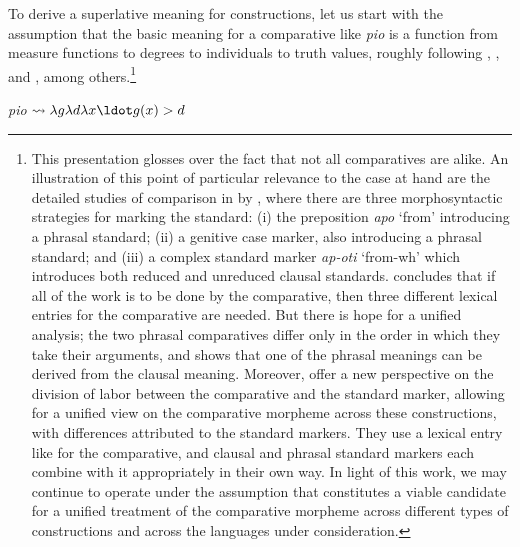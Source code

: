 \documentclass[output=paper
,modfonts
,nonflat]{langsci/langscibook}
\begin{document}
To derive a superlative meaning for  constructions, let us start with the assumption that the basic meaning for a comparative like  \textit{pio} is a function from measure functions to degrees to individuals to truth values, roughly following \citet{Kennedy2009}, \citet{AlrengaEtAlii2012}, and \citet{DunbarWellwood2016}, among others.\footnote{This presentation glosses over the fact that not all comparatives are alike. An illustration of this point of particular relevance to the case at hand are the detailed studies of comparison in  by \citet{Merchant2009,Merchant2012}, where there are three morphosyntactic strategies for marking the standard: (i) the preposition \textit{apo} `from' introducing a phrasal standard; (ii) a genitive case marker, also introducing a phrasal standard; and (iii) a complex standard marker \textit{ap-oti} `from-wh' which introduces both reduced and unreduced clausal standards. \citet{Merchant2012} concludes that if all of the work is to be done by the comparative, then three different lexical entries for the comparative are needed. But there is hope for a unified analysis; the two phrasal comparatives differ only in the order in which they take their arguments, and \citet{Kennedy2009} shows that one of the phrasal meanings can be derived from the clausal meaning. Moreover, \citet{AlrengaEtAlii2012} offer a new perspective on the division of labor between the comparative and the standard marker, allowing for a unified view on the comparative morpheme across these constructions, with differences attributed to the standard markers. They use a lexical entry like  for the comparative, and clausal and phrasal standard markers each combine with it appropriately in their own way. In light of this work, we may continue to operate under the assumption that  constitutes a viable candidate for a unified treatment of the comparative morpheme across different types of constructions and across the languages under consideration.}

\ea \label{ex:coppockstrand:78}
\textit{pio} $\leadsto \lambda g \lambda d \lambda x \ldot g(x) > d$
\z 
\end{document}
